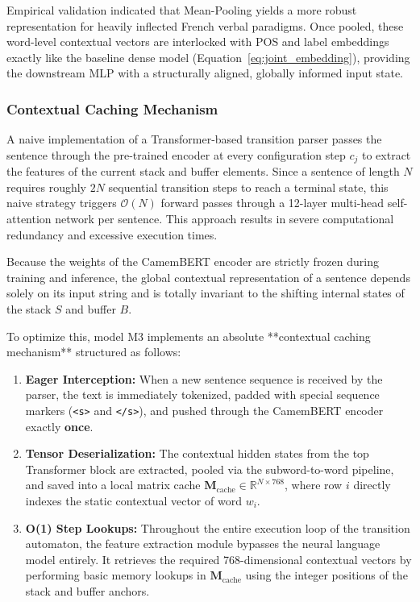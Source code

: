 \documentclass[12pt,a4paper]{article}
\begin{document}
Empirical validation indicated that Mean-Pooling yields a more robust representation for heavily inflected French verbal paradigms. Once pooled, these word-level contextual vectors are interlocked with POS and label embeddings exactly like the baseline dense model (Equation~\ref{eq:joint_embedding}), providing the downstream MLP with a structurally aligned, globally informed input state.

\subsubsection{Contextual Caching Mechanism}
A naive implementation of a Transformer-based transition parser passes the sentence through the pre-trained encoder at every configuration step $c_j$ to extract the features of the current stack and buffer elements. Since a sentence of length $N$ requires roughly $2N$ sequential transition steps to reach a terminal state, this naive strategy triggers $\mathcal{O}(N)$ forward passes through a 12-layer multi-head self-attention network per sentence. This approach results in severe computational redundancy and excessive execution times.

Because the weights of the CamemBERT encoder are strictly frozen during training and inference, the global contextual representation of a sentence depends solely on its input string and is totally invariant to the shifting internal states of the stack $S$ and buffer $B$. 

To optimize this, model M3 implements an absolute **contextual caching mechanism** structured as follows:

\begin{enumerate}
    \item \textbf{Eager Interception:} When a new sentence sequence is received by the parser, the text is immediately tokenized, padded with special sequence markers (\texttt{<s>} and \texttt{</s>}), and pushed through the CamemBERT encoder exactly \textbf{once}.
    \item \textbf{Tensor Deserialization:} The contextual hidden states from the top Transformer block are extracted, pooled via the subword-to-word pipeline, and saved into a local matrix cache $\mathbf{M}_{\text{cache}} \in \mathbb{R}^{N \times 768}$, where row $i$ directly indexes the static contextual vector of word $w_i$.
    \item \textbf{O(1) Step Lookups:} Throughout the entire execution loop of the transition automaton, the feature extraction module bypasses the neural language model entirely. It retrieves the required 768-dimensional contextual vectors by performing basic memory lookups in $\mathbf{M}_{\text{cache}}$ using the integer positions of the stack and buffer anchors.
\end{enumerate}
\end{document}
